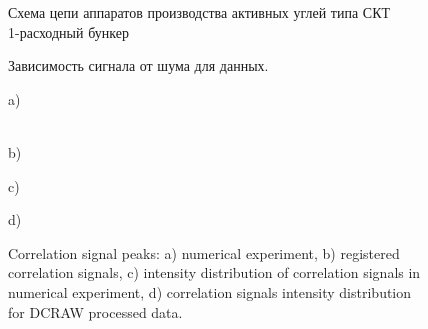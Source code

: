 \begin{figure}[h]
	\caption{Схема цепи аппаратов производства активных углей типа СКТ \\
1-расходный бункер}
	\label{ris:skt}
\end{figure}

\usepackage[final]{pdfpages}

	
		


\begin{figure}[h]
	\begin{minipage}[h]{0.49\linewidth}
	\end{minipage}
	\hfill
	\begin{minipage}[h]{0.49\linewidth}
	\end{minipage}
	\caption{Зависимость сигнала от шума для данных.}
	\label{ris:image1}
\end{figure} 


\begin{figure}[H]
	\begin{minipage}[h]{0.47\linewidth}
		 a) \\
	\end{minipage}
	\hfill
	\begin{minipage}[h]{0.47\linewidth}
		 \\b)
	\end{minipage}
	\vfill
	\begin{minipage}[h]{0.47\linewidth}
		 c) \\
	\end{minipage}
	\hfill
	\begin{minipage}[h]{0.47\linewidth}
		 d) \\
	\end{minipage}
	\caption{Correlation signal peaks: a) numerical experiment, b)
		registered correlation signals, c) intensity distribution of correlation
		signals in numerical experiment, d) correlation signals intensity
		distribution for DCRAW processed data.}
	\label{ris:experimentalcorrelationsignals}
\end{figure}

